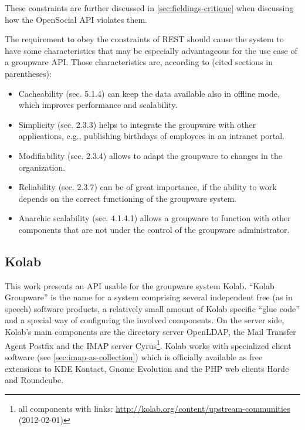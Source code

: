 \documentclass[11pt,a4paper,headsepline,twoside]{scrartcl}		%
\newcommand{\citeurl}[2]{\url{#1} (#2)}
\begin{document}
These constraints are further discussed in \autoref{sec:fieldings-critique} when
discussing how the OpenSocial API violates them.

The requirement to obey the constraints of REST should cause the system to have
some characteristics that may be especially advantageous for the use case of a
groupware API. Those characteristics are, according to \cite{Fielding2000}
(cited sections in parentheses):

\begin{itemize}
\item Cacheability (sec. 5.1.4) can keep the data available also in offline
  mode, which improves performance and scalability.
\item Simplicity (sec. 2.3.3) helps to integrate the groupware with other
  applications, e.g., publishing birthdays of employees in an intranet portal.
\item Modifiability (sec. 2.3.4) allows to adapt the groupware to changes in the
  organization.
\item Reliability (sec. 2.3.7) can be of great importance, if the ability to
  work depends on the correct functioning of the groupware system.
\item Anarchic scalability (sec. 4.1.4.1) allows a groupware to function with
  other components that are not under the control of the groupware
  administrator.
\end{itemize}


\subsection{Kolab}
\label{sec:kolab}

This work presents an API usable for the groupware system Kolab. ``Kolab
Groupware'' is the name for a system comprising several independent free (as in
speech) software products, a relatively small amount of Kolab specific ``glue
code'' and a special way of configuring the involved components. On the server
side, Kolab's main components are the directory server OpenLDAP, the Mail
Transfer Agent Postfix and the IMAP server Cyrus\footnote{all components with
  links:
  \citeurl{http://kolab.org/content/upstream-communities}{2012-02-01}}. Kolab
works with specialized client software (see \autoref{sec:imap-as-collection})
which is officially available as free extensions to KDE Kontact, Gnome Evolution
and the PHP web clients Horde and Roundcube.
\end{document}
